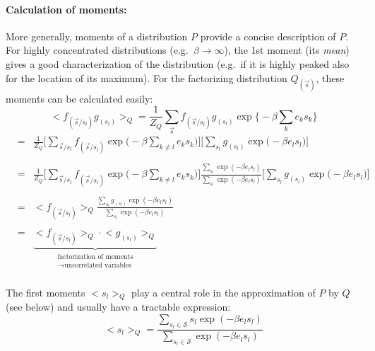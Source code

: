 \paragraph{Calculation of moments:}\label{sec:calculation-moments} More generally, moments of a distribution $P$ provide a concise description of $P$. For highly concentrated distributions (e.g.\ $\beta \to \infty$), the
1st moment (its \emph{mean}) gives a good characterization of the distribution
(e.g.\ if it is highly peaked also for the location of its maximum). For the factorizing distribution $Q_{(\vec{s})}$,
these moments can be calculated easily:
\begin{equation}\label{eq:factorizingMoments}
	\Big< f_{(\vec{s}/s_l)} g_{(s_l)} \Big>_Q
	 = \frac{1}{Z_Q} \sum\limits_{\vec{s}} f_{(\vec{s}/s_l)}
		g_{(s_l)} \exp \Big\{ -\beta \sum\limits_k e_k s_k \Big\}
\end{equation}
\begin{eqnarray*}
	& = & \frac{1}{Z_Q} \Bigg[ \sum\limits_{\vec{s}/s_l} f_{(\vec{s}/s_l)}
		\exp \Big( -\beta \sum\limits_{k \neq l} e_k s_k \Big) \Bigg]
		\Bigg[ \sum\limits_{s_l} g_{(s_l)} \exp \Big( -\beta e_l
			s_l \Big) \Bigg] \\\\
	& = & \frac{1}{Z_Q} \Bigg[ \sum\limits_{\vec{s}/s_l} f_{(\vec{s}/s_l)}
		\exp \Big( -\beta \sum\limits_{k \neq l} e_k s_k \Big) \Bigg]
  \frac{\sum\limits_{s_l} \exp(-\beta e_l s_l)}{\sum\limits_{s_l}
		\exp(-\beta e_l s_l)}
		\Bigg[ \sum\limits_{s_l} g_{(s_l)} \exp \Big( -\beta e_l
			s_l \Big) \Bigg] \\\\
	& = &\Big< f_{(\vec{s}/s_l)} \Big>_Q \frac{\sum\limits_{s_l}
		g_{(s_l)} \exp(-\beta e_l s_l)}{\sum\limits_{s_l}
		\exp(-\beta e_l s_l)} \\\\
	& = & \underbrace{ \Big< f_{(\vec{s}/s_l)} \Big>_Q \cdot \Big<g_{(s_l)} 
		\Big>_Q }_{ 	\substack{ \text{factorization of moments} \\
				\rightarrow \text{uncorrelated variables}} }
\end{eqnarray*}
\\
The first moments $\big< s_l \big>_Q$ play a central role in the approximation of $P$ by $Q$ (see below) and usually have a tractable expression:  
\begin{equation} \label{eq:mfa_firstmoment_Q}
	\big< s_l \big>_Q = \frac{\sum\limits_{s_l \in \mathcal{S}} s_l \exp(-\beta e_l s_l)}{
					\sum\limits_{s_l \in \mathcal{S}} \exp(-\beta e_l s_l)}
\end{equation}

